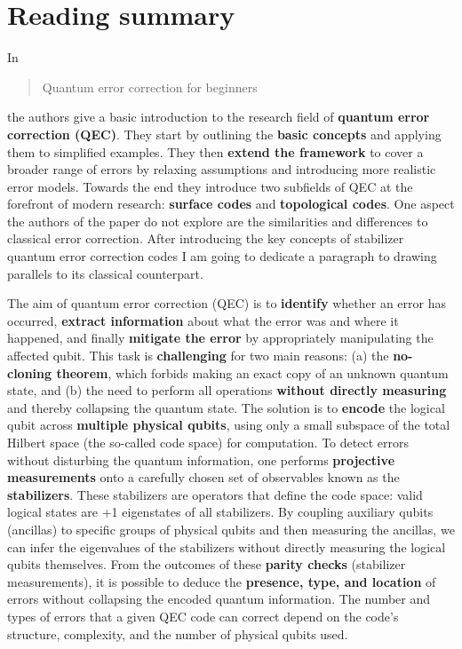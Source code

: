 \documentclass{alex_summary}
\begin{document}
\section*{Reading summary}

In \blockcquote{devitt_quantum_2013}{Quantum error correction for beginners} the authors give a basic introduction to the research field of \textbf{quantum error correction (QEC)}. They start by outlining the \textbf{basic concepts} and applying them to simplified examples. They then \textbf{extend the framework} to cover a broader range of errors by relaxing assumptions and introducing more realistic error models. Towards the end they introduce two subfields of QEC at the forefront of modern research: \textbf{surface codes} and \textbf{topological codes}. One aspect the authors of the paper do not explore are the similarities and differences to classical error correction. After introducing the key concepts of stabilizer quantum error correction codes I am going to dedicate a paragraph to drawing parallels to its classical counterpart.

The aim of quantum error correction (QEC) is to \textbf{identify} whether an error has occurred, \textbf{extract information} about what the error was and where it happened, and finally \textbf{mitigate the error} by appropriately manipulating the affected qubit. This task is \textbf{challenging} for two main reasons: (a) the \textbf{no-cloning theorem}, which forbids making an exact copy of an unknown quantum state, and (b) the need to perform all operations \textbf{without directly measuring} and thereby collapsing the quantum state. The solution is to \textbf{encode} the logical qubit across \textbf{multiple physical qubits}, using only a small subspace of the total Hilbert space (the so-called code space) for computation. To detect errors without disturbing the quantum information, one performs \textbf{projective measurements} onto a carefully chosen set of observables known as the \textbf{stabilizers}. These stabilizers are operators that define the code space: valid logical states are +1 eigenstates of all stabilizers. By coupling auxiliary qubits (ancillas) to specific groups of physical qubits and then measuring the ancillas, we can infer the eigenvalues of the stabilizers without directly measuring the logical qubits themselves. From the outcomes of these \textbf{parity checks} (stabilizer measurements), it is possible to deduce the \textbf{presence, type, and location} of errors without collapsing the encoded quantum information. The number and types of errors that a given QEC code can correct depend on the code’s structure, complexity, and the number of physical qubits used.
 
\end{document}
